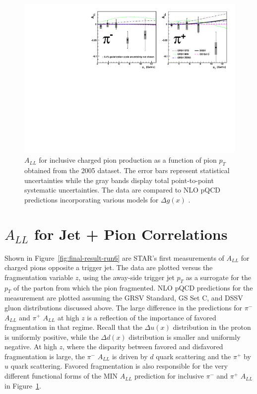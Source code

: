 \begin{figure}[ht]
  \includegraphics[width=1.0\textwidth]{figures/final-result-run5-2}
  \caption{$A_{LL}$ for inclusive charged pion production as a function of pion $p_T$ obtained from the 2005 dataset.  The error bars represent statistical uncertainties while the gray bands display total point-to-point systematic uncertainties.  The data are compared to NLO pQCD predictions incorporating various models for $\Delta g(x)$ \cite{Gluck:2000dy, Gehrmann:1995ag, deFlorian:2008mr}.}
  \label{fig:final-result-run5}
\end{figure}

\section{$A_{LL}$ for Jet + Pion Correlations}

Shown in Figure~\ref{fig:final-result-run6} are STAR's first measurements of
\(A_{LL}\) for charged pions opposite a trigger jet. The data are plotted versus
the fragmentation variable \(z\), using the away-side trigger jet \(p_T\) as a
surrogate for the \(p_T\) of the parton from which the pion fragmented. NLO pQCD
predictions for the measurement are plotted assuming the GRSV Standard, GS Set
C, and DSSV gluon distributions discussed above. The large difference in the
predictions for \(\pi^-\) \(A_{LL}\) and \(\pi^+\) \(A_{LL}\) at high \(z\) is a
reflection of the importance of favored fragmentation in that regime. Recall
that the \(\Delta u(x)\) distribution in the proton is uniformly positive, while
the \(\Delta d(x)\) distribution is smaller and uniformly negative. At high
\(z\), where the disparity between favored and disfavored fragmentation is
large, the \(\pi^-\) \(A_{LL}\) is driven by \(d\) quark scattering and the
\(\pi^+\) by \(u\) quark scattering. Favored fragmentation is also responsible
for the very different functional forms of the MIN \(A_{LL}\) prediction for
inclusive \(\pi^-\) and \(\pi^+\) \(A_{LL}\) in
Figure~\ref{fig:final-result-run5}.

